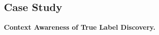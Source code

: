 



\subsection{Case Study}
\label{subsec:case}



\smallskip
\noindent
\textsf{\small\textbf{Context Awareness of True Label Discovery. }} 

